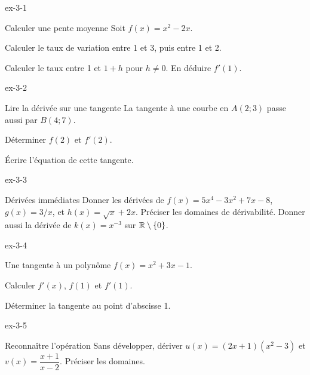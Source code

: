 \begin{blocLivre}{ex-3-1}
\begin{exercice}[1]{Calculer une pente moyenne}
Soit $f(x)=x^2-2x$.
\begin{questions}\item Calculer le taux de variation entre 1 et 3, puis entre 1 et 2.
\item Calculer le taux entre 1 et $1+h$ pour $h\neq0$. En déduire $f'(1)$.
\end{questions}
\end{exercice}
\end{blocLivre}
\begin{blocLivre}{ex-3-2}
\begin{exercice}[1]{Lire la dérivée sur une tangente}
La tangente à une courbe en $A(2;3)$ passe aussi par $B(4;7)$.
\begin{questions}\item Déterminer $f(2)$ et $f'(2)$.
\item Écrire l'équation de cette tangente.
\end{questions}
\label{figlivre-r03-02-tangente-ex}

\end{exercice}
\end{blocLivre}
\begin{blocLivre}{ex-3-3}
\begin{exercice}[1]{Dérivées immédiates}
Donner les dérivées de $f(x)=5x^4-3x^2+7x-8$, $g(x)=3/x$,
et $h(x)=\sqrt x+2x$. Préciser les domaines de dérivabilité.
Donner aussi la dérivée de $k(x)=x^{-3}$ sur $\mathbb{R}\setminus\{0\}$.
\end{exercice}
\end{blocLivre}
\begin{blocLivre}{ex-3-4}
\begin{exercice}[1]{Une tangente à un polynôme}
$f(x)=x^2+3x-1$.
\begin{questions}\item Calculer $f'(x)$, $f(1)$ et $f'(1)$.
\item Déterminer la tangente au point d'abscisse 1.
\end{questions}
\end{exercice}
\end{blocLivre}
\begin{blocLivre}{ex-3-5}
\begin{exercice}[1]{Reconnaître l'opération}
Sans développer, dériver $u(x)=(2x+1)(x^2-3)$ et
$v(x)=\dfrac{x+1}{x-2}$. Préciser les domaines.
\end{exercice}
\end{blocLivre}
